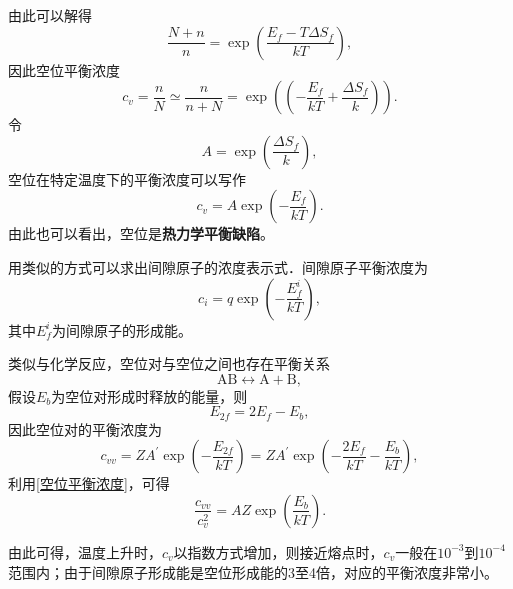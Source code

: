             由此可以解得
            \begin{equation}
                \frac{N+n}{n}=\exp\left( {\frac{E_{f}-T \Delta S_{f}}{k T}} \right),
            \end{equation}
            因此空位平衡浓度
            \begin{equation}
                c_v=\frac{n}{N}\simeq\frac{n}{n+N}=\exp{\left( (-\frac{E_f}{kT}+\frac{\Delta S_f}{k}) \right)}.
            \end{equation}
            令
            \begin{equation}
                A=\exp\left( {\frac{\Delta S_f}{k}} \right),
            \end{equation}
            空位在特定温度下的平衡浓度可以写作
            \begin{equation}
                c_v=A\exp\left( {-\frac{E_f}{kT}} \right)\label{空位平衡浓度}.
            \end{equation}
            由此也可以看出，空位是\textbf{热力学平衡缺陷}。
            
            用类似的方式可以求出间隙原子的浓度表示式．间隙原子平衡浓度为
            \begin{equation}
                c_i=q\exp\left( -\frac{E_f^i}{kT} \right),
            \end{equation}
            其中$E_f^i$为间隙原子的形成能。

            类似与化学反应，空位对与空位之间也存在平衡关系
            \begin{equation}
                \mathrm{AB}\leftrightarrow \mathrm{A}+\mathrm{B},
            \end{equation}
            假设$E_b$为空位对形成时释放的能量，则
            \begin{equation}
                E_{2f}=2E_f-E_b,
            \end{equation}
            因此空位对的平衡浓度为
            \begin{equation}
                c_{vv}=ZA^{\prime}\exp{\left( -\frac{E_{2f}}{kT} \right)}=ZA^{\prime}\exp{\left( -\frac{2E_f}{kT}-\frac{E_b}{kT} \right)},
            \end{equation}
            利用\autoref{空位平衡浓度}，可得
            \begin{equation}
                \frac{c_{vv}}{c_v^2}=AZ\exp{\left( \frac{E_b}{kT}\right)}.
            \end{equation}

            由此可得，温度上升时，$c_v$以指数方式增加，则接近熔点时，$c_v$一般在$10^{-3}$到$10^{-4}$
            范围内；由于间隙原子形成能是空位形成能的3至4倍，对应的平衡浓度非常小。

